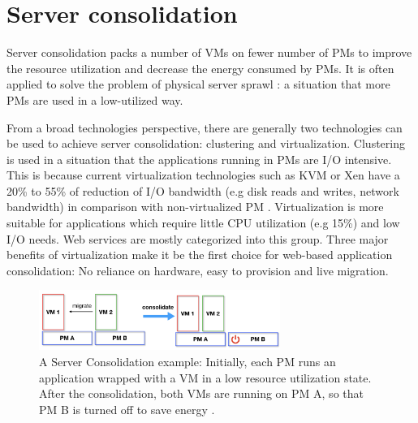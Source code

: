 \section{Server consolidation}

Server consolidation packs a number of VMs on fewer number of PMs to improve the resource utilization and decrease the energy consumed by PMs. It is often applied to solve the problem of physical server sprawl \cite{Khanna:2006vq}: a situation that more PMs are used in a low-utilized way. 



From a broad technologies perspective, there are generally two technologies can be used to achieve server consolidation: clustering and virtualization. Clustering is used in a situation that the applications running in PMs are I/O intensive. This is because current virtualization technologies  such as KVM \cite{Kivity:2007wu} or Xen \cite{Barham:2003cj} have a 20\% to 55\% of reduction of I/O bandwidth (e.g disk reads and writes, network bandwidth) in comparison with non-virtualized PM \cite{Shafer:2010vh}. Virtualization is more suitable for applications which require little CPU utilization (e.g 15\%) and low I/O needs. Web services are mostly categorized into this group. Three major benefits of virtualization make it be the first choice for web-based application consolidation: No reliance on hardware, easy to provision and live migration.

\begin{figure}
	\centering
	\includegraphics[width=0.7\textwidth]{pics/consolidate.png}
	\caption{A Server Consolidation example: Initially, each PM runs an application wrapped with a VM in a low resource utilization state. After the consolidation, both VMs are running on PM A, so that PM B is turned off to save energy \cite{Barroso:2007jt}.}
	\label{fig:consolidation}
\end{figure}

